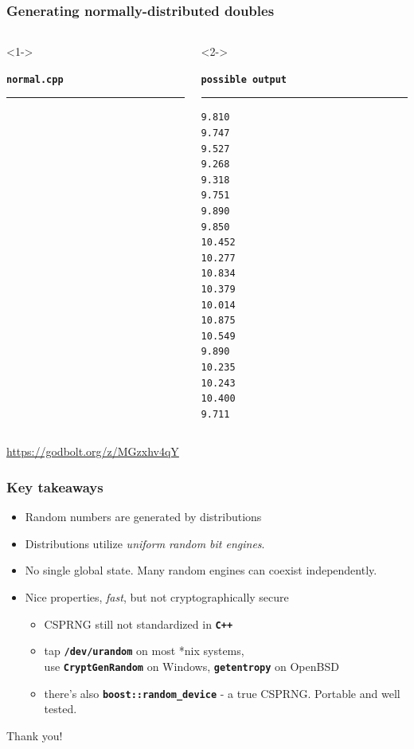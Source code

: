 \documentclass[aspectratio=169]{beamer}
\newcommand{\cpp}[1]{\texttt{\textbf{\textcolor{clCodeBlue}{#1}}}}
\begin{document}
\begin{frame}[fragile]
\frametitle{Generating normally-distributed doubles}
\begin{columns}[T]
  \begin{column}{0.6\textwidth}<1->
    {\color[HTML]{cb4b16}
    \texttt{\textbf{normal.cpp}}\vspace{-9pt}
    \rule{\linewidth}{2pt}}%
    {\fontsize{8}{6} }%
    \vspace{-12pt}{\color[HTML]{cb4b16}\rule{\linewidth}{2pt}}%
  \end{column}
  \begin{column}{0.3\textwidth}<2->
    {\color[HTML]{002b36}
    \texttt{\textbf{possible output}}\vspace{-9pt}
    \rule{\linewidth}{2pt}}%
    {\fontsize{8}{6} \begin{lstlisting}[showstringspaces=false]
9.810
9.747
9.527
9.268
9.318
9.751
9.890
9.850
10.452
10.277
10.834
10.379
10.014
10.875
10.549
9.890
10.235
10.243
10.400
9.711
    \end{lstlisting}}
    \vspace{-12pt}{\color[HTML]{002b36}\rule{\linewidth}{2pt}}%
  \end{column}
\end{columns}
\pause{}
\begin{center}\url{https://godbolt.org/z/MGzxhv4qY}\end{center}
\end{frame}



\begin{frame}
\frametitle{Key takeaways}
{\centering
\begin{itemize}
  \item{} Random numbers are generated by distributions
  \item{} Distributions utilize \textit{uniform random bit engines}.
  \item{} No single global state. Many random engines can coexist independently.
  \item{} Nice properties, \textit{fast}, but not cryptographically secure
  \begin{itemize}
    \item{} CSPRNG still not standardized in \cpp{C++}
    \item{} tap \cpp{/dev/urandom} on most *nix systems,\\
            use \cpp{CryptGenRandom} on Windows, \cpp{getentropy} on OpenBSD
    \item{} there's also \cpp{boost::random\_device} - a true CSPRNG. Portable and well tested.
  \end{itemize}

\end{itemize}

\vspace{2ex}
\begin{center}{\Large Thank you!}\end{center}
}
\end{frame}

\end{document}
